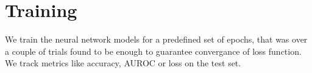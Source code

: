 \section{Training}

We train the neural network models for a predefined set of epochs, that was over a couple of trials found to be enough to guarantee convergance of loss function.
We track metrics like accuracy, AUROC or loss on the test set.





